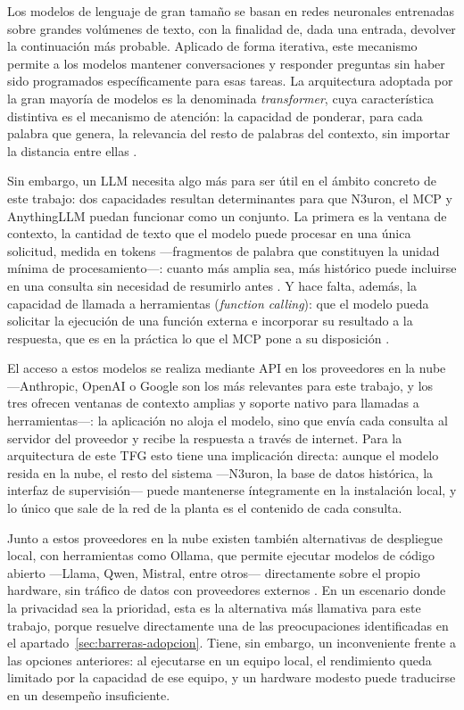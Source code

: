 Los modelos de lenguaje de gran tamaño se basan en redes neuronales
entrenadas sobre grandes volúmenes de texto, con la finalidad de, dada una
entrada, devolver la continuación más probable. Aplicado de forma iterativa,
este mecanismo permite a los modelos mantener conversaciones y responder
preguntas sin haber sido programados específicamente para esas tareas. La
arquitectura adoptada por la gran mayoría de modelos es la denominada
\emph{transformer}, cuya característica distintiva es el mecanismo de
atención: la capacidad de ponderar, para cada palabra que genera, la
relevancia del resto de palabras del contexto, sin importar la distancia
entre ellas \cite{vaswani2017}.

Sin embargo, un LLM necesita algo más para ser útil en el ámbito concreto de
este trabajo: dos capacidades resultan determinantes para que N3uron, el
MCP y AnythingLLM puedan funcionar como un conjunto. La primera es la
ventana de contexto, la cantidad de texto que el modelo puede procesar en
una única solicitud, medida en tokens —fragmentos de palabra que
constituyen la unidad mínima de procesamiento—: cuanto más amplia sea, más
histórico puede incluirse en una consulta sin necesidad de resumirlo antes
\cite{google-longcontext}. Y hace falta, además, la capacidad de llamada a
herramientas (\emph{function calling}): que el modelo pueda solicitar la
ejecución de una función externa e incorporar su resultado a la respuesta,
que es en la práctica lo que el MCP pone a su disposición
\cite{google-functioncalling}.

El acceso a estos modelos se realiza mediante API en los proveedores en la
nube —Anthropic, OpenAI o Google son los más relevantes para este trabajo, y
los tres ofrecen ventanas de contexto amplias y soporte nativo para
llamadas a herramientas—: la aplicación no aloja el modelo, sino que envía
cada consulta al servidor del proveedor y recibe la respuesta a través de
internet. Para la arquitectura de este TFG esto tiene una implicación
directa: aunque el modelo resida en la nube, el resto del sistema —N3uron,
la base de datos histórica, la interfaz de supervisión— puede mantenerse
íntegramente en la instalación local, y lo único que sale de la red de la
planta es el contenido de cada consulta.

Junto a estos proveedores en la nube existen también alternativas de
despliegue local, con herramientas como Ollama, que permite ejecutar
modelos de código abierto —Llama, Qwen, Mistral, entre otros— directamente
sobre el propio hardware, sin tráfico de datos con proveedores externos
\cite{ollama-official}. En un escenario donde la privacidad sea la prioridad, esta es la
alternativa más llamativa para este trabajo, porque resuelve directamente
una de las preocupaciones identificadas en el
apartado~\ref{sec:barreras-adopcion}. Tiene, sin embargo, un inconveniente frente a las
opciones anteriores: al ejecutarse en un equipo local, el rendimiento queda
limitado por la capacidad de ese equipo, y un hardware modesto puede
traducirse en un desempeño insuficiente.

